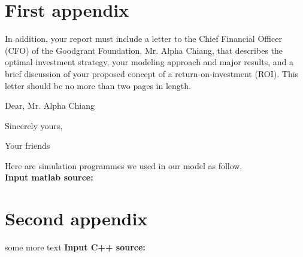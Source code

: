 \documentclass{mcmthesis}
\begin{document}



\begin{appendices}

\section{First appendix}

In addition, your report must include a letter to the Chief Financial Officer (CFO) of the Goodgrant Foundation, Mr. Alpha Chiang, that describes the optimal investment strategy, your modeling approach and major results, and a brief discussion of your proposed concept of a return-on-investment (ROI). This letter should be no more than two pages in length.

\begin{letter}{Dear, Mr. Alpha Chiang}

\lipsum[1-2]

\vspace{\parskip}

Sincerely yours,

Your friends

\end{letter}
Here are simulation programmes we used in our model as follow.\\

\textbf{\textcolor[rgb]{0.98,0.00,0.00}{Input matlab source:}}


\section{Second appendix}

some more text \textcolor[rgb]{0.98,0.00,0.00}{\textbf{Input C++ source:}}


\end{appendices}
\end{document}
